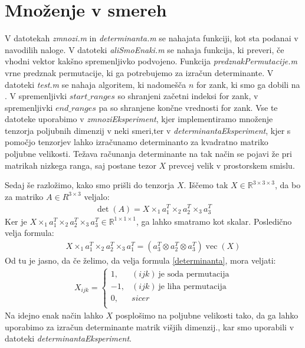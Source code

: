\documentclass[a4paper,12pt]{article}
\def\R{\mathbb{R}} %
\DeclareMathOperator{\ve}{vec}
\begin{document}
\section{Množenje v smereh}
V datotekah \emph{zmnozi.m} in \emph{determinanta.m} se nahajata funkciji, kot sta podanai v navodilih naloge. V datoteki \emph{aliSmoEnaki.m} se nahaja funkcija, ki preveri, če vhodni vektor kakšno spremenljivko podvojeno. Funkcija \emph{predznakPermutacije.m} vrne predznak permutacije, ki ga potrebujemo za izračun determinante. V datoteki \emph{test.m} se nahaja algoritem, ki nadomešča $n$ for zank, ki smo ga dobili na \cite{vir1}. V spremenljivki $start\_ranges$ so shranjeni začetni indeksi for zank,  v spremenljivki $end\_ranges$ pa so shranjene končne vrednosti for zank. Vse te datoteke uporabimo v \emph{zmnoziEksperiment}, kjer implementiramo množenje tenzorja poljubnih dimenzij v neki smeri,ter v \emph{determinantaEksperiment}, kjer s pomočjo tenzorjev lahko izračunamo determinanto za kvadratno matriko poljubne velikosti. Težava računanja determinante na tak način se pojavi že pri matrikah nizkega ranga, saj postane tezor $X$ prevcej velik v prostorskem smislu. 

Sedaj še razložimo, kako smo prišli do tenzorja $X$. 
Iščemo tak $X\in \R^{3\times3\times3}$, da bo za matriko $A \in R^{3\times 3}$ veljalo:
\begin{align}
\label{determinanta}
	\det(A) = X \times_1 a_1^T \times_2 a_2^T \times_3 a_3^T
\end{align}
Ker je $X \times_1 a_1^T \times_2 a_2^T \times_3 a_3^T \in \R^{1\times1\times1}$, ga lahko smatramo kot skalar. Posledično velja formula: 
\begin{align*}
	X \times_1 a_1^T \times_2 a_2^T \times_3 a_1^T = (a_3^T\otimes a_2^T\otimes a_3^T)\ve(X)
\end{align*}
Od tu je jasno, da če želimo, da velja formula \eqref{determinanta}, mora veljati:
\begin{align*}
	X_{ijk} = \begin{cases}
	1 , &(i j k) ~\text{je soda permutacija}  \\
	-1, &(i j k) ~\text{je liha permutacija}  \\
	0, &sicer\\
	\end{cases}
\end{align*}
Na idejno enak način lahko $X$ posplošimo na poljubne velikosti tako, da ga lahko uporabimo za izračun determinante matrik višjih dimenzij., kar smo uporabili v datoteki \emph{determinantaEksperiment}.  
\end{document}
